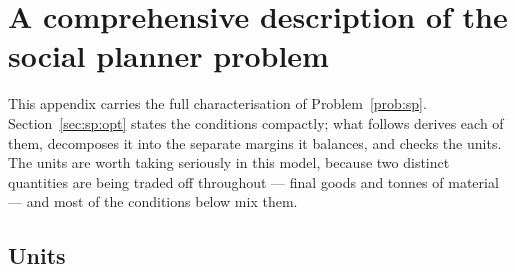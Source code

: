 \section{A comprehensive description of the social planner problem}\label{sec:app:sp}

This appendix carries the full characterisation of Problem~\ref{prob:sp}. Section~\ref{sec:sp:opt} states the conditions compactly; what follows derives each of them, decomposes it into the separate margins it balances, and checks the units. The units are worth taking seriously in this model, because two distinct quantities are being traded off throughout --- final goods and tonnes of material --- and most of the conditions below mix them.

\subsection{Units}\label{sec:app:sp:units}


